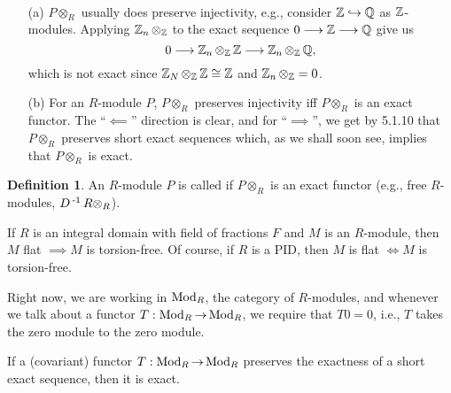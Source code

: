 \documentclass[11pt]{book}
\theoremstyle{definition}   \newtheorem{defn}[counter]{Definition} %
\DeclareMathOperator{\ra}{\rightarrow}   \DeclareMathOperator{\Poly}{\mathbf{P}}   \DeclareMathOperator{\spn}{\textnormal{span}}   \DeclareMathOperator{\aut}{\textnormal{Aut}}
\newcommand{\vs}{\vspace{8pt}}
\numberwithin{counter}{chapter}
\begin{document}
\vs

\begin{remark}\ 
\begin{enumerate}
\item[(a)] $P \otimes_R$ usually does  preserve injectivity, e.g., consider $\operatorname{\mathbb{Z}} \hookrightarrow \operatorname{\mathbb{Q}}$ as $\operatorname{\mathbb{Z}}$-modules. Applying $\operatorname{\mathbb{Z}}_n \otimes_{\operatorname{\mathbb{Z}}}$ to the exact sequence $0 \longrightarrow \operatorname{\mathbb{Z}} \longrightarrow \operatorname{\mathbb{Q}}$ give us
	\[0 \longrightarrow \operatorname{\mathbb{Z}}_n \otimes_{\operatorname{\mathbb{Z}}} \operatorname{\mathbb{Z}} \longrightarrow \operatorname{\mathbb{Z}}_n \otimes_{\operatorname{\mathbb{Z}}} \operatorname{\mathbb{Q}}, \]
which is not exact since $\operatorname{\mathbb{Z}}_N \otimes_{\operatorname{\mathbb{Z}}} \operatorname{\mathbb{Z}} \cong \operatorname{\mathbb{Z}}$ and $\operatorname{\mathbb{Z}}_n \otimes_{\operatorname{\mathbb{Z}}} = 0$. 

\item[(b)] For an $R$-module $P$, $P \otimes_R$ preserves injectivity iff $P \otimes_R$ is an exact functor. The ``$\impliedby$'' direction is clear, and for ``$\implies$'', we get by 5.1.10 that $P \otimes_R$ preserves short exact sequences which, as we shall soon see, implies that $P \otimes_R$ is exact. 
\end{enumerate}
\end{remark}

\vs

\begin{defn}
An $R$-module $P$ is called  if $P \otimes_R$ is an exact functor (e.g., free $R$-modules, $D\operatorname{^{-1}} R \otimes_R$). 
\end{defn}

\vs

\begin{remark*}
If $R$ is an integral domain with field of fractions $F$ and $M$ is an $R$-module, then $M$ flat $\implies M$ is torsion-free. Of course, if $R$ is a PID, then $M$ is flat $\iff M$ is torsion-free. 
\end{remark*}


Right now, we are working in $\textnormal{Mod}_R$, the category of $R$-modules, and whenever we talk about a functor $T : \tn{Mod}_R \ra \tn{Mod}_R$, we require that $T 0 = 0$, i.e., $T$ takes the zero module to the zero module. \\

\begin{lemma}
If a (covariant) functor $T : \tn{Mod}_R \ra \tn{Mod}_R$ preserves the exactness of a short exact sequence, then it is exact.
\end{lemma}
\end{document}
